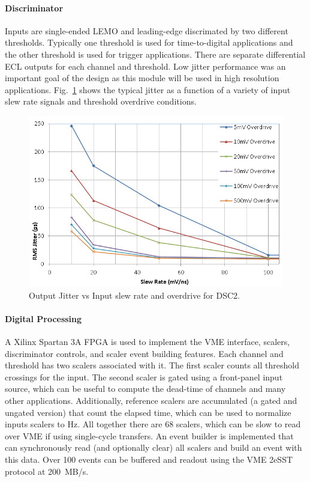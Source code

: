 \paragraph{Discriminator}
Inputs are single-ended LEMO and leading-edge discrimated by two different thresholds. Typically one threshold is used for time-to-digital applications and the other threshold is used for trigger applications. There are separate differential ECL outputs for each channel and threshold. Low jitter performance was an important goal of the design as this module will be used in high resolution applications. Fig.~\ref{fig:dsc2_jitter} shows the typical jitter as a function of a variety of input slew rate signals and threshold overdrive conditions.

\begin{figure}[hbt]
	\centering
	\includegraphics[width=1.0\columnwidth,keepaspectratio]{img/dsc2_jitter.png}
	\caption{Output Jitter vs Input slew rate and overdrive for DSC2.}
	\label{fig:dsc2_jitter}
\end{figure}

\paragraph{Digital Processing}
A Xilinx Spartan 3A FPGA is used to implement the VME interface, scalers, discriminator controls, and scaler event building features. Each channel and threshold has two scalers associated with it. The first scaler counts all threshold crossings for the input. The second scaler is gated using a front-panel input source, which can be useful to compute the dead-time of channels and many other applications. Additionally, reference scalers are accumulated (a gated and ungated version) that count the elapsed time, which can be used to normalize inputs scalers to Hz. All together there are 68 scalers, which can be slow to read over VME if using single-cycle transfers. An event builder is implemented that can synchronously read (and optionally clear) all scalers and build an event with this data. Over 100 events can be buffered and readout using the VME 2eSST protocol at 200~MB/s.


